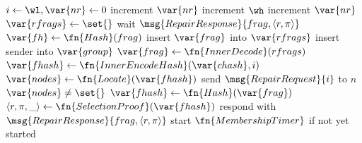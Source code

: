 \pagebreak

\begin{algorithm}
    \begin{algorithmic}[1]
            \State $i \gets \wl, \var{nr} \gets 0$
                        \State increment $\var{nr}$
                    \EndIf
                \EndIf
            \EndFor
                \State increment $\wh$
                    \State increment $\var{nr}$
                \EndIf
            \EndWhile
                \State $\var{rfrags} \gets \set{}$
                    \State wait $\msg{RepairResponse}{frag, \langle r, \pi \rangle}$
                    \State $\var{fh} \gets \fn{Hash}(frag)$
                        \State insert $\var{frag}$ into $\var{rfrags}$
                        \State insert sender into $\var{group}$
                    \EndIf
                \EndWhile
                \State $\var{frag} \gets \fn{InnerDecode}(rfrags)$
            \EndIf
        \EndProcedure
            \State $\var{fhash} \gets \fn{InnerEncodeHash}(\var{chash}, i)$
            \State $\var{nodes} \gets \fn{Locate}(\var{fhash})$
                \State send $\msg{RepairRequest}{i}$ to $n$
            \EndFor
            \State \Return $\var{nodes} \ne \set{}$
        \EndProcedure
                \State $\var{fhash} \gets \fn{Hash}(\var{frag})$
                \State $\langle r, \pi, \_ \rangle \gets \fn{SelectionProof}(\var{fhash})$
                \State respond with $\msg{RepairResponse}{frag, \langle r, \pi \rangle}$
            \Else
                \State start $\fn{MembershipTimer}$ if not yet started
            \EndIf
        \EndProcedure
    \end{algorithmic}
    \caption{Protocol to repair encoded chunk}
    \label{alg:repair}
\end{algorithm}
